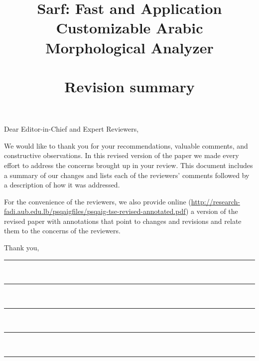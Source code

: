\documentclass[11pt]{article}
\title{Sarf: Fast and Application Customizable Arabic Morphological Analyzer
 \\
~~ \\
  Revision summary }
\date{}
\begin{document}
\maketitle

{\noindent Dear Editor-in-Chief and Expert Reviewers,}

We would like to thank you for your recommendations, valuable comments, 
and constructive observations. 
In this revised version of the paper we made every effort to address the 
concerns brought up in your review. 
This document includes a summary of our changes and lists each of the 
reviewers’ comments followed by a description of how it was addressed. 

For the convenience of the reviewers, we also provide online 
(\url{http://research-fadi.aub.edu.lb/psqaigfiles/psqaig-tse-revised-annotated.pdf})  
a version of the revised paper with annotations that point to changes and 
revisions and relate them to the concerns of the reviewers. 

Thank you,
\newline
\hrule


~\newline
\hrule


~\newline
\hrule


~\newline
\hrule


~\newline
\hrule

\newsavebox\mytempbib
\savebox\mytempbib{\parbox{\textwidth}{
%
}}
\end{document}
